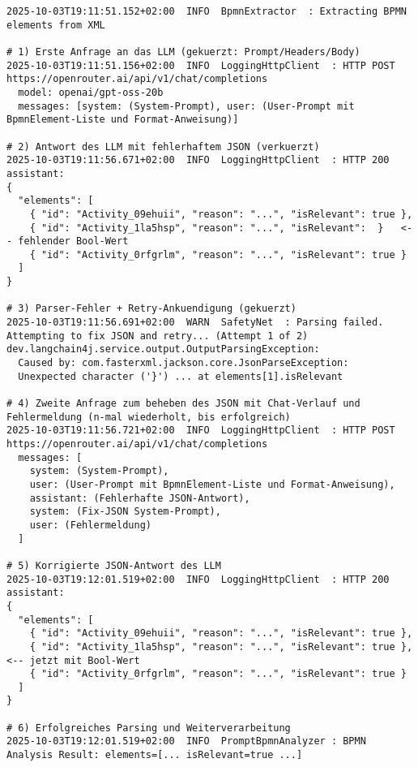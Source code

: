 \begin{lstlisting}[caption={Zusammengefasster Logauszug zum Retry-Mechanismus}, label={lst:retry-log}]
2025-10-03T19:11:51.152+02:00  INFO  BpmnExtractor  : Extracting BPMN elements from XML

# 1) Erste Anfrage an das LLM (gekuerzt: Prompt/Headers/Body)
2025-10-03T19:11:51.156+02:00  INFO  LoggingHttpClient  : HTTP POST https://openrouter.ai/api/v1/chat/completions
  model: openai/gpt-oss-20b
  messages: [system: (System-Prompt), user: (User-Prompt mit BpmnElement-Liste und Format-Anweisung)]

# 2) Antwort des LLM mit fehlerhaftem JSON (verkuerzt)
2025-10-03T19:11:56.671+02:00  INFO  LoggingHttpClient  : HTTP 200
assistant:
{
  "elements": [
    { "id": "Activity_09ehuii", "reason": "...", "isRelevant": true },
    { "id": "Activity_1la5hsp", "reason": "...", "isRelevant":  }   <-- fehlender Bool-Wert
    { "id": "Activity_0rfgrlm", "reason": "...", "isRelevant": true }
  ]
}

# 3) Parser-Fehler + Retry-Ankuendigung (gekuerzt)
2025-10-03T19:11:56.691+02:00  WARN  SafetyNet  : Parsing failed. Attempting to fix JSON and retry... (Attempt 1 of 2)
dev.langchain4j.service.output.OutputParsingException:
  Caused by: com.fasterxml.jackson.core.JsonParseException:
  Unexpected character ('}') ... at elements[1].isRelevant

# 4) Zweite Anfrage zum beheben des JSON mit Chat-Verlauf und Fehlermeldung (n-mal wiederholt, bis erfolgreich)
2025-10-03T19:11:56.721+02:00  INFO  LoggingHttpClient  : HTTP POST https://openrouter.ai/api/v1/chat/completions
  messages: [
    system: (System-Prompt),
    user: (User-Prompt mit BpmnElement-Liste und Format-Anweisung),
    assistant: (Fehlerhafte JSON-Antwort),
    system: (Fix-JSON System-Prompt),
    user: (Fehlermeldung)
  ]

# 5) Korrigierte JSON-Antwort des LLM
2025-10-03T19:12:01.519+02:00  INFO  LoggingHttpClient  : HTTP 200
assistant:
{
  "elements": [
    { "id": "Activity_09ehuii", "reason": "...", "isRelevant": true },
    { "id": "Activity_1la5hsp", "reason": "...", "isRelevant": true }, <-- jetzt mit Bool-Wert
    { "id": "Activity_0rfgrlm", "reason": "...", "isRelevant": true }
  ]
}

# 6) Erfolgreiches Parsing und Weiterverarbeitung
2025-10-03T19:12:01.519+02:00  INFO  PromptBpmnAnalyzer : BPMN Analysis Result: elements=[... isRelevant=true ...]
\end{lstlisting}

